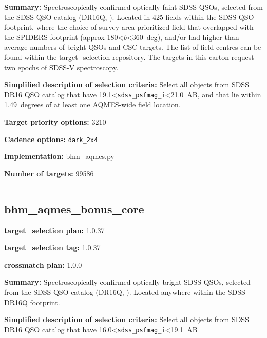 \noindent\textbf{Summary:} Spectroscopically confirmed optically faint SDSS QSOs,
selected from the SDSS QSO catalog (DR16Q,
\citealt{Lyke2020}). Located in 425 fields within the SDSS QSO footprint,
where the choice of survey area prioritized field that overlapped with
the SPIDERS footprint (approx 180\textless{}\emph{b}\textless360~deg),
and/or had higher than average numbers of bright QSOs and CSC targets.
The list of field centres can be found
\href{https://github.com/sdss/target_selection/blob/0.3.0/python/target_selection/masks/candidate_target_fields_bhm_aqmes_wide_v0.3.1.fits}{within
the target\_selection repository}. The targets in this carton request
two epochs of SDSS-V spectroscopy.

\noindent\textbf{Simplified description of selection criteria:} Select all
objects from SDSS DR16 QSO catalog that have
19.1\textless{}\texttt{sdss\_psfmag\_i}\textless21.0~AB, and that lie
within 1.49~degrees of at least one AQMES-wide field location.


\noindent\textbf{Target priority options:} 3210

\noindent\textbf{Cadence options:} \texttt{dark\_2x4}

\noindent\textbf{Implementation:}
\href{https://github.com/sdss/target_selection/blob/1.0.37/python/target_selection/cartons/bhm_aqmes.py}{bhm\_aqmes.py}

\noindent\textbf{Number of targets:} 99586

\begin{center}\rule{0.5\linewidth}{0.5pt}\end{center}

\hypertarget{bhm_aqmes_bonus_core_plan1.0.37}{%
\subsection{bhm\_aqmes\_bonus\_core}\label{bhm_aqmes_bonus_core_plan1.0.37}}

\noindent\textbf{target\_selection plan:} 1.0.37

\noindent\textbf{target\_selection tag:}
\href{https://github.com/sdss/target_selection/tree/1.0.37/}{1.0.37}

\noindent\textbf{crossmatch plan:} 1.0.0

\noindent\textbf{Summary:} Spectroscopically confirmed optically bright SDSS
QSOs, selected from the SDSS QSO catalog (DR16Q,
\citealt{Lyke2020}). Located anywhere within the SDSS DR16Q footprint.

\noindent\textbf{Simplified description of selection criteria:} Select all
objects from SDSS DR16 QSO catalog that have
16.0\textless{}\texttt{sdss\_psfmag\_i}\textless19.1~AB


